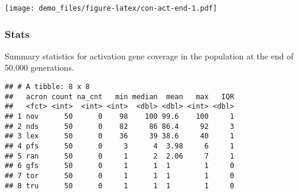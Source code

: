 \documentclass[]{book}
\newenvironment{Shaded}{\begin{snugshade}}{\end{snugshade}}
\newcommand{\DataTypeTok}[1]{\textcolor[rgb]{0.13,0.29,0.53}{#1}}
\newcommand{\KeywordTok}[1]{\textcolor[rgb]{0.13,0.29,0.53}{\textbf{#1}}}
\newcommand{\NormalTok}[1]{#1}
\newcommand{\OperatorTok}[1]{\textcolor[rgb]{0.81,0.36,0.00}{\textbf{#1}}}
\newcommand{\OtherTok}[1]{\textcolor[rgb]{0.56,0.35,0.01}{#1}}
\newcommand{\StringTok}[1]{\textcolor[rgb]{0.31,0.60,0.02}{#1}}
\begin{document}
\texttt{[image: demo\_files/figure-latex/con-act-end-1.pdf]}

\hypertarget{stats-7}{%
\subsubsection{Stats}\label{stats-7}}

Summary statistics for activation gene coverage in the population at the end of 50,000 generations.

\begin{Shaded}
\end{Shaded}

\begin{verbatim}
## # A tibble: 8 x 8
##   acron count na_cnt   min median  mean   max   IQR
##   <fct> <int>  <int> <int>  <dbl> <dbl> <int> <dbl>
## 1 nov      50      0    98    100 99.6    100     1
## 2 nds      50      0    82     86 86.4     92     3
## 3 lex      50      0    36     39 38.6     40     1
## 4 pfs      50      0     3      4  3.98     6     1
## 5 ran      50      0     1      2  2.06     7     1
## 6 gfs      50      0     1      1  1        1     0
## 7 tor      50      0     1      1  1        1     0
## 8 tru      50      0     1      1  1        1     0
\end{verbatim}
\end{document}
